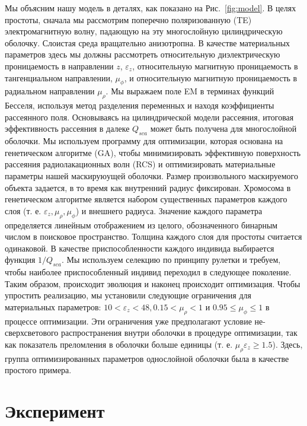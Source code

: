\documentclass[a4paper, 12pt]{article}
\begin{document}
Мы объясним нашу модель в деталях, как показано на Рис.~\ref{fig:model}.
В целях простоты, сначала мы рассмотрим поперечно поляризованную (TE)
электромагнитную волну, падающую на эту многослойную цилиндрическую оболочку.
Слоистая среда вращательно анизотропна. В качестве материальных параметров 
здесь мы должны рассмотреть относительную диэлектрическую проницаемость
в направлении $z$, $\varepsilon_z$, относительную магнитную проницаемость
в тангенциальном направлении, $\mu_\phi$, и относительную магнитную 
проницаемость в радиальном направлении $\mu_\rho$. Мы выражаем поле EM в
терминах функций Бесселя, используя метод разделения переменных и находя
коэффициенты рассеянного поля. Основываясь на цилиндрической модели рассеяния,
итоговая эффективность рассеяния в далеке $Q_{sca}$ может быть получена для
многослойной оболочки. Мы используем программу для оптимизации, которая
основана на генетическом алгоритме (GA), чтобы минимизировать эффективную
поверхность рассеяния радиолакационных волн (RCS) и оптимизировать материальные
параметры нашей маскируюущей оболочки. Размер произвольного маскируемого 
объекта задается, в то время как внутренний радиус фиксирован. Хромосома в 
генетическом алгоритме является набором существенных параметров каждого слоя
(т. е. $\varepsilon_z, \mu_\rho, \mu_\phi$) и внешнего радиуса. Значение 
каждого параметра определяется линейным отображением из целого, 
обозначенного бинарным числом в поисковое пространство. Толщина каждого слоя
для простоты считается одинаковой. В качестве приспособленности каждого
индивида выбирается функция $1/Q_{sca}$. Мы используем селекцию по принципу
рулетки и требуем, чтобы наиболее приспособленный индивид переходил в следующее
поколение. Таким образом, происходит эволюция и наконец происходит оптимизация.
Чтобы упростить реализацию, мы установили следующие ограничения для 
материальных параметров: $10 < \varepsilon_z < 48, 0.15 < \mu_\rho < 1$ и 
$0.95 \le \mu_\phi \le 1$ в процессе оптимизации. Эти ограничения уже 
предполагают условие не-сверхсветового распространения внутри оболочки в 
процедуре оптимизации, так как показатель преломления в оболочки больше единицы
(т. е. $\mu_\rho \varepsilon_z \ge 1.5$). Здесь, группа оптимизированных
параметров однослойной оболочки была в качестве простого примера. 

\section{Эксперимент}
\end{document}
